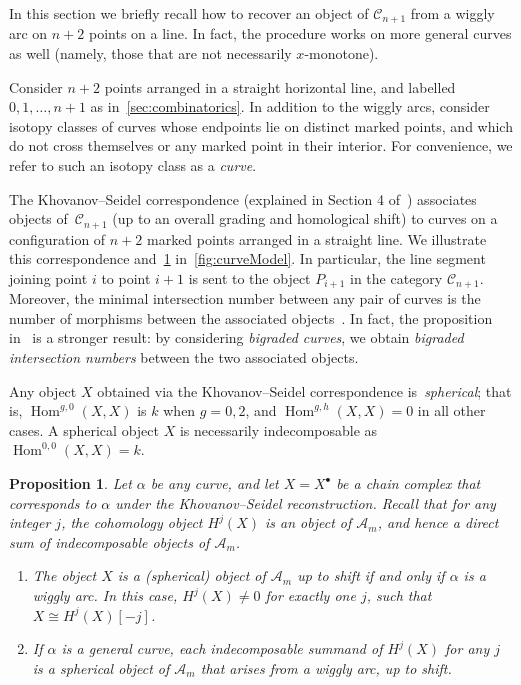 \documentclass{amsart}
\newtheorem{proposition}[theorem]{Proposition}
\theoremstyle{definition}
\DeclareMathOperator{\Hom}{Hom} %
\newcommand{\darkblue}{\color{darkblue}} %
\newcommand{\defn}[1]{\textsl{\darkblue #1}} %
\begin{document}
In this section we briefly recall how to recover an object of \(\mathcal{C}_{n+1}\) from a wiggly arc on \(n+2\) points on a line.
In fact, the procedure works on more general curves as well (namely, those that are not necessarily \(x\)-monotone).

Consider \(n+2\) points arranged in a straight horizontal line, and labelled \(0,1, \ldots, n+1\) as in~\cref{sec:combinatorics}.
In addition to the wiggly arcs, consider isotopy classes of curves whose endpoints lie on distinct marked points, and which do not cross themselves or any marked point in their interior.
For convenience, we refer to such an isotopy class as a \defn{curve}.

The Khovanov--Seidel correspondence (explained in Section 4 of~\cite{kho.sei:02}) associates objects of~\(\mathcal{C}_{n+1}\) (up to an overall grading and homological shift) to curves on a configuration of \(n+2\) marked points arranged in a straight line.
We illustrate this correspondence and~\cref{prop:cohomology-pieces} in~\cref{fig:curveModel}.
In particular, the line segment joining point \(i\) to point \(i+1\) is sent to the object \(P_{i+1}\) in the category \(\mathcal{C}_{n+1}\).
Moreover, the minimal intersection number between any pair of curves is the number of morphisms between the associated objects~\cite[Prop.~4.9]{kho.sei:02}.
In fact, the proposition in~\cite{kho.sei:02} is a stronger result: by considering \emph{bigraded curves}, we obtain \emph{bigraded intersection numbers} between the two associated objects.

Any object \(X\) obtained via the Khovanov--Seidel correspondence is~\defn{spherical}; that is, \(\Hom^{g,0}(X,X)\) is \(k\) when \(g = 0,2\), and \(\Hom^{g,h}(X,X) = 0\) in all other cases.
A spherical object \(X\) is necessarily indecomposable as \(\Hom^{0,0}(X,X) = k\).

\begin{proposition}
\label{prop:cohomology-pieces}
Let \(\alpha\) be any curve, and let \(X = X^{\bullet}\) be a chain complex that corresponds to \(\alpha\) under the Khovanov--Seidel reconstruction.
Recall that for any integer \(j\), the cohomology object \(H^j(X)\) is an object of \(\mathcal{A}_m\), and hence a direct sum of indecomposable objects of \(\mathcal{A}_m\).
\begin{enumerate}
\item The object \(X\) is a (spherical) object of \(\mathcal{A}_m\) up to shift if and only if \(\alpha\) is a wiggly arc. In this case, \(H^j(X) \neq 0\) for exactly one \(j\), such that \(X \cong H^j(X)[-j]\).
\item If \(\alpha\) is a general curve, each indecomposable summand of \(H^j(X)\) for any \(j\) is a spherical object of \(\mathcal{A}_m\) that arises from a wiggly arc, up to shift.
\end{enumerate}
\end{proposition}
\end{document}

